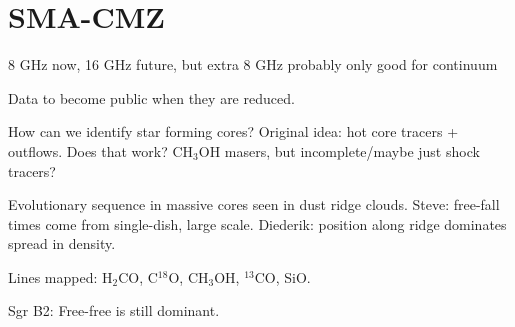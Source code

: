 \section{SMA-CMZ}
8 GHz now, 16 GHz future, but extra 8 GHz probably only good for continuum

Data to become public when they are reduced.

How can we identify star forming cores?  Original idea: hot core tracers + outflows.  Does that work? CH$_3$OH masers, but incomplete/maybe just shock tracers?

Evolutionary sequence in massive cores seen in dust ridge clouds.  Steve: free-fall times come from single-dish, large scale.  Diederik: position along ridge dominates spread in density.

Lines mapped: H$_2$CO, C$^{18}$O, CH$_3$OH, $^{13}$CO, SiO.

Sgr B2: Free-free is still dominant.